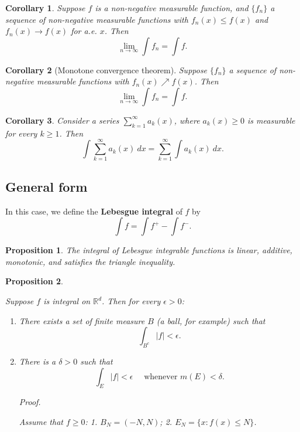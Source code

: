\documentclass[
]{book}
\providecommand{\tightlist}{%
  \setlength{\itemsep}{0pt}\setlength{\parskip}{0pt}}
\newtheorem{corollary}{Corollary}[chapter]
\newtheorem{proposition}{Proposition}[chapter]
\theoremstyle{definition}
\theoremstyle{definition}
\theoremstyle{definition}
\theoremstyle{definition}
\theoremstyle{remark}
\begin{document}
\begin{corollary}
Suppose \(f\) is a non-negative measurable function, and \(\{f_n\}\) a sequence of non-negative measurable functions with \(f_n(x) \le f(x)\) and \(f_n(x)\to f(x)\) for a.e. \(x\). Then
\[
\lim_{n\to\infty}\int f_n=\int f.
\]
\end{corollary}

\begin{corollary}[Monotone convergence theorem]
\protect\hypertarget{cor:m}{}\label{cor:m}Suppose \(\{f_n\}\) a sequence of non-negative measurable functions with \(f_n(x) \nearrow f(x)\). Then
\[
\lim_{n\to\infty}\int f_n=\int f.
\]
\end{corollary}

\begin{corollary}
\protect\hypertarget{cor:sm}{}\label{cor:sm}Consider a series \(\sum_{k=1}^{\infty}a_k(x)\), where \(a_k(x)\ge 0\) is measurable for every \(k\ge 1\). Then
\[
\int \sum_{k=1}^{\infty}a_k(x)\ dx =\sum_{k=1}^{\infty}\int a_k(x)\ dx.
\]
\end{corollary}

\subsection{General form}\label{general-form}

In this case, we define the \textbf{Lebesgue integral} of \(f\) by
\[
\int f =\int f^+-\int f^-.
\]

\begin{proposition}
The integral of Lebesgue integrable functions is linear, additive, monotonic, and satisfies the triangle inequality.
\end{proposition}

\begin{proposition}
\protect\hypertarget{prp:uc}{}\label{prp:uc}

Suppose \(f\) is integral on \(\mathbb{R}^d\). Then for every \(\epsilon>0\):

\begin{enumerate}
\def\labelenumi{\arabic{enumi}.}
\tightlist
\item
  There exists a set of finite measure \(B\) (a ball, for example) such that
  \[
  \int_{B^c}|f|<\epsilon.
  \]
\item
  There is a \(\delta>0\) such that
  \[
  \int_E|f|<\epsilon\quad \text{ whenever }m(E)<\delta.
  \]

  \emph{Proof.}

  Assume that \(f\ge 0\): 1. \(B_N=(-N,N)\); 2. \(E_N=\{x:f(x)\le N\}\).
\end{enumerate}

\end{proposition}
\end{document}
